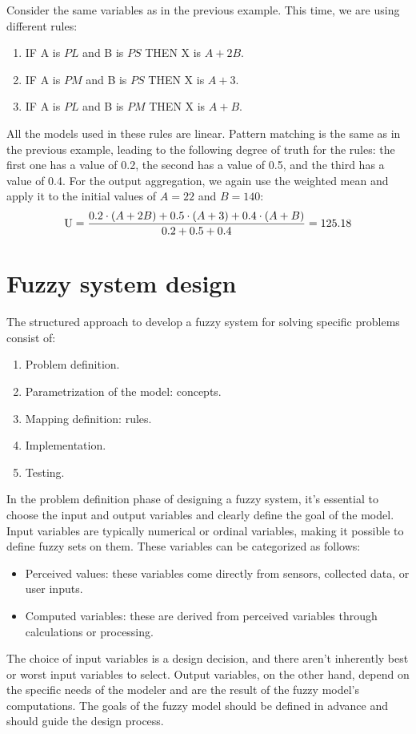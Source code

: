 \documentclass[12pt, a4paper]{report}
\begin{document}
    \begin{example}
        Consider the same variables as in the previous example. This time, we are using different rules:
        \begin{enumerate}
            \item IF A is $PL$ and B is $PS$ THEN X is $A+2B$.
            \item IF A is $PM$ and B is $PS$ THEN X is $A+3$. 
            \item IF A is $PL$ and B is $PM$ THEN X is $A+B$.
        \end{enumerate}
        All the models used in these rules are linear. 
        Pattern matching is the same as in the previous example, leading to the following degree of truth for the rules: the first one has a value of 0.2, the second has a value of 0.5, and the third has a value of 0.4.
        For the output aggregation, we again use the weighted mean and apply it to the initial values of $A=22$ and $B=140$:
        \[\textnormal{U}=\dfrac{0.2 \cdot (A+2B)+0.5 \cdot (A+3)+ 0.4 \cdot (A+B)}{0.2+0.5+0.4}=125.18\]
    \end{example}

    \section{Fuzzy system design}
    The structured approach to develop a fuzzy system for solving specific problems consist of: 
    \begin{enumerate}
        \item Problem definition.
        \item Parametrization of the model: concepts.
        \item Mapping definition: rules.
        \item Implementation.
        \item Testing.
    \end{enumerate}
    In the problem definition phase of designing a fuzzy system, it's essential to choose the input and output variables and clearly define the goal of the model. 
    Input variables are typically numerical or ordinal variables, making it possible to define fuzzy sets on them. 
    These variables can be categorized as follows:

    \begin{itemize}
        \item Perceived values: these variables come directly from sensors, collected data, or user inputs.
        \item Computed variables: these are derived from perceived variables through calculations or processing.
    \end{itemize}
    The choice of input variables is a design decision, and there aren't inherently best or worst input variables to select. 
    Output variables, on the other hand, depend on the specific needs of the modeler and are the result of the fuzzy model's computations. 
    The goals of the fuzzy model should be defined in advance and should guide the design process.
\end{document}
